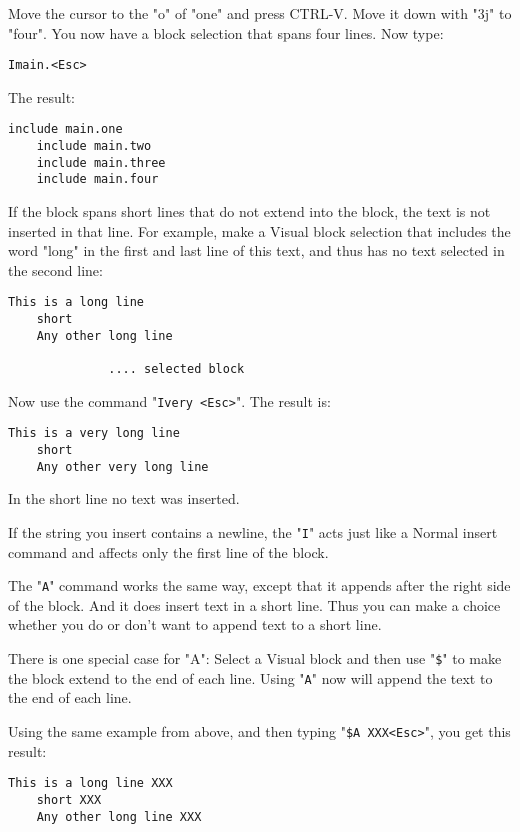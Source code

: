 {Move the cursor to the "o" of "one" and press CTRL-V.
Move it down with "3j" to "four".
You now have a block selection that spans four lines.
Now type:

\begin{Verbatim}[samepage=true]
 Imain.<Esc>
\end{Verbatim}

The result:

\begin{Verbatim}[samepage=true]
    include main.one 
    include main.two 
    include main.three 
    include main.four 
\end{Verbatim}

If the block spans short lines that do not extend into the block, the text is not inserted in that line.
For example, make a Visual block selection that includes the word "long" in the first and last line of this text, and thus has no text selected in the second line:

\begin{Verbatim}[samepage=true]
    This is a long line 
    short 
    Any other long line 

              .... selected block
\end{Verbatim}

Now use the command "\texttt{Ivery <Esc>}".
The result is:

\begin{Verbatim}[samepage=true]
    This is a very long line 
    short 
    Any other very long line 
\end{Verbatim}

In the short line no text was inserted.

If the string you insert contains a newline, the "\texttt{I}" acts just like a Normal insert command and affects only the first line of the block.

The "\texttt{A}" command works the same way, except that it appends after the right side of the block.
And it does insert text in a short line.
Thus you can make a choice whether you do or don't want to append text to a short line.

There is one special case for "A": Select a Visual block and then use "\texttt{\$}" to make the block extend to the end of each line.
Using "\texttt{A}" now will append the text to the end of each line.

Using the same example from above, and then typing "\texttt{\$A XXX<Esc>}", you get this result:

\begin{Verbatim}[samepage=true]
    This is a long line XXX 
    short XXX 
    Any other long line XXX 
\end{Verbatim}

}
